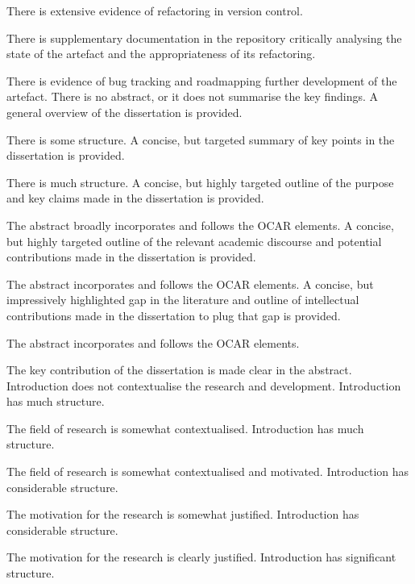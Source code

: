 \begin{markingrubric}
        \grade There is extensive evidence of refactoring in version control. 
            \par There is supplementary documentation in the repository critically analysing the state of the artefact and the appropriateness of its refactoring.  
            \par There is evidence of bug tracking and roadmapping further development of the artefact.  
%
        \grade \fail There is no abstract, or it does not summarise the key findings.
      \grade A general overview of the dissertation is provided.
        	\par There is some structure.		
      \grade A concise, but targeted summary of key points in the dissertation is provided.
        	\par There is much structure.	      	
       \grade A concise, but highly targeted outline of the purpose and key claims made in the dissertation is provided.
        	\par The abstract broadly incorporates and follows the OCAR elements.	  
      \grade A concise, but highly targeted outline of the relevant academic discourse and potential contributions made in the dissertation is provided.
        	\par The abstract incorporates and follows the OCAR elements.	      	
       \grade A concise, but impressively highlighted gap in the literature and outline of intellectual contributions made in the dissertation to plug that gap is provided. 
        	\par The abstract incorporates and follows the OCAR elements.
        	\par The key contribution of the dissertation is made clear in the abstract.
%
        \grade \fail Introduction does not contextualise the research and development.
      \grade Introduction has much structure.
        	\par The field of research is somewhat contextualised.
      \grade Introduction has much structure.
        	\par The field of research is somewhat contextualised and motivated.	      	
       \grade Introduction has considerable structure.
        	\par The motivation for the research is somewhat justified.	  
      \grade Introduction has considerable structure.
        	\par The motivation for the research is clearly justified.	 	      	
       \grade Introduction has significant structure.

\end{markingrubric}

